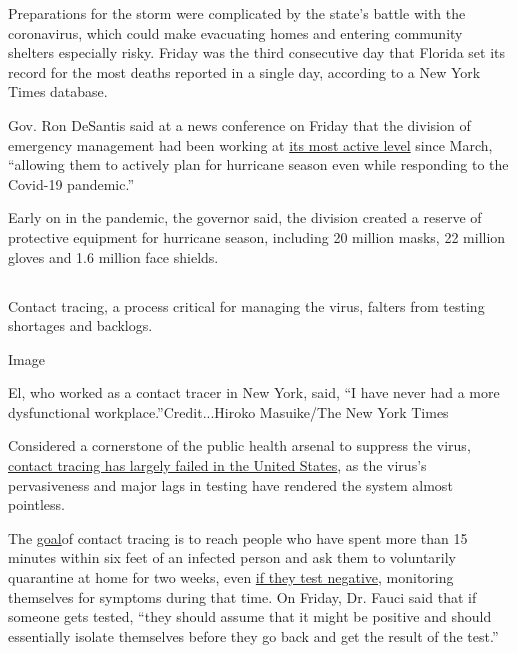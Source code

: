 Preparations for the storm were complicated by the state's battle with
the coronavirus, which could make evacuating homes and entering
community shelters especially risky. Friday was the third consecutive
day that Florida set its record for the most deaths reported in a single
day, according to a New York Times database.

Gov. Ron DeSantis said at a news conference on Friday that the division
of emergency management had been working at
\href{https://www.floridadisaster.org/sert/eoc-activation-levels/}{its
most active level} since March, ``allowing them to actively plan for
hurricane season even while responding to the Covid-19 pandemic.''

Early on in the pandemic, the governor said, the division created a
reserve of protective equipment for hurricane season, including 20
million masks, 22 million gloves and 1.6 million face shields.

\hypertarget{-4}{%
\subsection{}\label{-4}}

Contact tracing, a process critical for managing the virus, falters from
testing shortages and backlogs.

Image

El, who worked as a contact tracer in New York, said, ``I have never had
a more dysfunctional workplace.''Credit...Hiroko Masuike/The New York
Times

Considered a cornerstone of the public health arsenal to suppress the
virus,
\href{https://www.nytimes.com/2020/07/31/health/covid-contact-tracing-tests.html}{contact
tracing has largely failed in the United States}, as the virus's
pervasiveness and major lags in testing have rendered the system almost
pointless.

The
\href{https://www.cdc.gov/coronavirus/2019-ncov/php/contact-tracing/contact-tracing-plan/contact-tracing.html}{goal}of
contact tracing is to reach people who have spent more than 15 minutes
within six feet of an infected person and ask them to voluntarily
quarantine at home for two weeks, even
\href{https://www.cdc.gov/coronavirus/2019-ncov/symptoms-testing/testing.html}{if
they test negative}, monitoring themselves for symptoms during that
time. On Friday, Dr. Fauci said that if someone gets tested, ``they
should assume that it might be positive and should essentially isolate
themselves before they go back and get the result of the test.''

